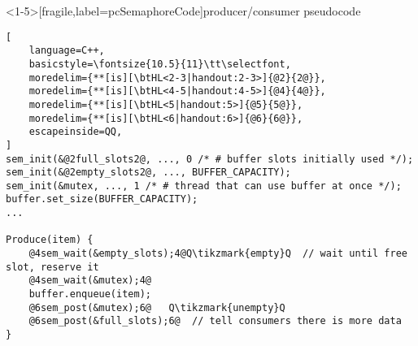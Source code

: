 \begin{frame}<1-5>[fragile,label=pcSemaphoreCode]{producer/consumer pseudocode}
\begin{lstlisting}[
    language=C++,
    basicstyle=\fontsize{10.5}{11}\tt\selectfont,
    moredelim={**[is][\btHL<2-3|handout:2-3>]{@2}{2@}},
    moredelim={**[is][\btHL<4-5|handout:4-5>]{@4}{4@}},
    moredelim={**[is][\btHL<5|handout:5>]{@5}{5@}},
    moredelim={**[is][\btHL<6|handout:6>]{@6}{6@}},
    escapeinside=QQ,
]
sem_init(&@2full_slots2@, ..., 0 /* # buffer slots initially used */);
sem_init(&@2empty_slots2@, ..., BUFFER_CAPACITY);
sem_init(&mutex, ..., 1 /* # thread that can use buffer at once */);
buffer.set_size(BUFFER_CAPACITY);
...

Produce(item) {
    @4sem_wait(&empty_slots);4@Q\tikzmark{empty}Q  // wait until free slot, reserve it
    @4sem_wait(&mutex);4@
    buffer.enqueue(item);
    @6sem_post(&mutex);6@   Q\tikzmark{unempty}Q
    @6sem_post(&full_slots);6@  // tell consumers there is more data
}


\end{lstlisting}
\end{frame}
